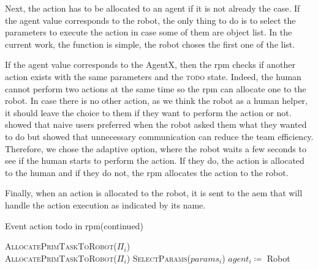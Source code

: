 \documentclass[a4paper,11pt,twoside]{StyleThese}
\begin{document}
Next, the action has to be allocated to an agent if it is not already the case. If the agent value corresponds to the robot, the only thing to do is to select the parameters to execute the action in case some of them are object list. In the current work, the function is simple, the robot choses the first one of the list. 

If the agent value corresponds to the AgentX, then the \acrshort{rpm} checks if another action exists with the same parameters and the \textsc{todo} state. Indeed, the human cannot perform two actions at the same time so the \acrshort{rpm} can allocate one to the robot. In case there is no other action, as we think the robot as a human helper, it should leave the choice to them if they want to perform the action or not. \cite{devin_2017_decisions} showed that naive users preferred when the robot asked them what they wanted to do but \cite{macmillan_2004_communication} showed that unnecessary communication can reduce the team efficiency. Therefore, we chose the adaptive option, where the robot waits a few seconds to see if the human starts to perform the action. If they do, the action is allocated to the human and if they do not, the \acrshort{rpm} allocates the action to the robot. 

Finally, when an action is allocated to the robot, it is sent to the \acrlong{aem} that will handle the action execution as indicated by its name.


\begin{algorithm}[!htb]
	\ContinuedFloat
	\caption{Event action todo in \acrshort{rpm}(continued)}
	\begin{algorithmic}
			\State \textsc{AllocatePrimTaskToRobot($\Pi_i$)}
		\Else
			\\
			\EndWhile
				\State \textsc{AllocatePrimTaskToRobot($\Pi_i$)}
			\EndIf
		\EndIf
	\EndFunction
	\Statex
		\State \textsc{SelectParams($params_i$)}
		\State $agent_i \coloneqq$ Robot
	\EndFor
	\EndFunction
	\end{algorithmic}
\end{algorithm}
\end{document}
